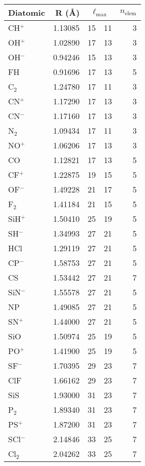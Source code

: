 \begin{tabular}{l|r|r|r|r}
\hline
\textbf{Diatomic} & R (\AA) & \multicolumn{2}{c|}{$\ell_\mathrm{max}$} & $n_\mathrm{elem}$ \\
\hline
CH$^+$  & 1.13085 & 15 & 11 &  3 \\
OH$^+$  & 1.02890 & 17 & 13 &  3 \\
OH$^-$  & 0.94246 & 15 & 13 &  3 \\
FH      & 0.91696 & 17 & 13 &  5 \\
C$_2$   & 1.24780 & 17 & 11 &  3 \\
CN$^+$  & 1.17290 & 17 & 13 &  3 \\
CN$^-$  & 1.17160 & 17 & 13 &  3 \\
N$_2$   & 1.09434 & 17 & 11 &  3 \\
NO$^+$  & 1.06206 & 17 & 13 &  3 \\
CO      & 1.12821 & 17 & 13 &  5 \\
CF$^+$  & 1.22875 & 19 & 15 &  5 \\
OF$^-$  & 1.49228 & 21 & 17 &  5 \\
F$_2$   & 1.41184 & 21 & 15 &  5 \\
SiH$^+$ & 1.50410 & 25 & 19 &  5 \\
SH$^-$  & 1.34993 & 27 & 21 &  5 \\
HCl     & 1.29119 & 27 & 21 &  5 \\
CP$^-$  & 1.58753 & 27 & 21 &  5 \\
CS      & 1.53442 & 27 & 21 &  7 \\
SiN$^-$ & 1.55578 & 27 & 21 &  5 \\
NP      & 1.49085 & 27 & 21 &  5 \\
SN$^+$  & 1.44000 & 27 & 21 &  5 \\
SiO     & 1.50974 & 25 & 19 &  5 \\
PO$^+$  & 1.41900 & 25 & 19 &  5 \\
SF$^-$  & 1.70395 & 29 & 23 &  7 \\
ClF     & 1.66162 & 29 & 23 &  7 \\
SiS     & 1.93000 & 31 & 23 &  7 \\
P$_2$   & 1.89340 & 31 & 23 &  7 \\
PS$^+$  & 1.87200 & 31 & 23 &  7 \\
SCl$^-$ & 2.14846 & 33 & 25 &  7 \\
Cl$_2$  & 2.04262 & 33 & 25 &  7 \\
\hline
\end{tabular}
